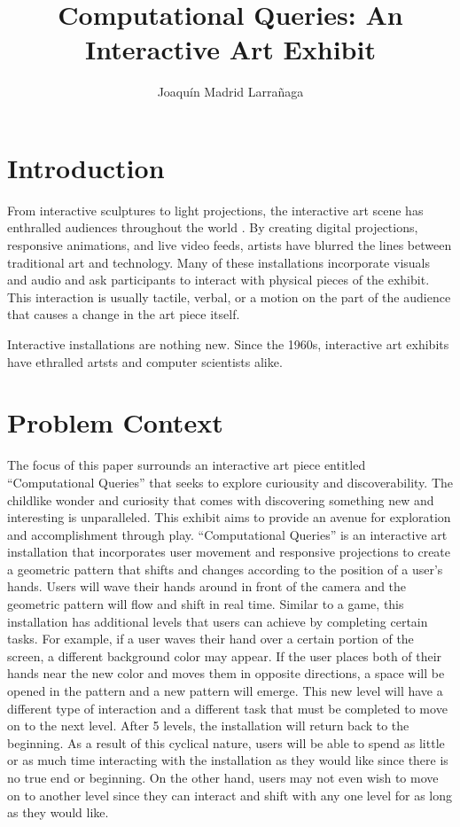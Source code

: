 \documentclass[10pt,twocolumn]{article}
\title{Computational Queries: An Interactive Art Exhibit}
\author{Joaquín Madrid Larrañaga}
\affiliation{Occidental College}
\begin{document}
\maketitle

\begin{abstract}
    
\end{abstract}

\section{Introduction}
From interactive sculptures to light projections, the interactive art scene has enthralled audiences throughout the world \cite{sarto_disneys_2021, noauthor_teamlab_2020}.  By creating digital projections, responsive animations, and live video feeds, artists have blurred the lines between traditional art and technology.  Many of these installations incorporate visuals and audio and ask participants to interact with physical pieces of the exhibit. This interaction is usually tactile, verbal, or a motion on the part of the audience that causes a change in the art piece itself.  

Interactive installations are nothing new. Since the 1960s, interactive art exhibits have ethralled artsts and computer scientists alike\cite{trifonova_software_2008}.

\section{Problem Context}	
The focus of this paper surrounds an interactive art piece entitled ``Computational Queries'' that seeks to explore curiousity and discoverability.  The childlike wonder and curiosity that comes with discovering something new and interesting is unparalleled. This exhibit aims to provide an avenue for exploration and accomplishment through play.  ``Computational Queries'' is an interactive art installation that incorporates user movement and responsive projections to create a geometric pattern that shifts and changes according to the position of a user's hands.  Users will wave their hands around in front of the camera and the geometric pattern will flow and shift in real time. Similar to a game, this installation has additional levels that users can achieve by completing certain tasks.  For example, if a user waves their hand over a certain portion of the screen, a different background color may appear.  If the user places both of their hands near the new color and moves them in opposite directions, a space will be opened in the pattern and a new pattern will emerge.  This new level will have a different type of interaction and a different task that must be completed to move on to the next level.  After 5 levels, the installation will return back to the beginning.  As a result of this cyclical nature, users will be able to spend as little or as much time interacting with the installation as they would like since there is no true end or beginning. On the other hand, users may not even wish to move on to another level since they can interact and shift with any one level for as long as they would like.  
\end{document}
